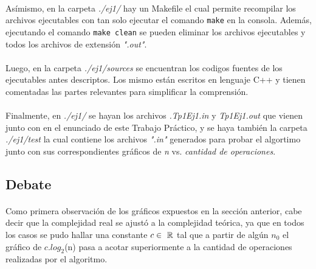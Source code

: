 \paragraph{}
Asímismo, en la carpeta \textit{./ej1/} hay un Makefile el cual permite recompilar los archivos ejecutables con tan solo ejecutar el comando \texttt{make} en la consola. Además, ejecutando el comando \texttt{make clean} se pueden eliminar los archivos ejecutables y todos los archivos de extensión \textit{".out"}.

\paragraph{}
Luego, en la carpeta \textit{./ej1/sources} se encuentran los codigos fuentes de los ejecutables antes descriptos. Los mismo están escritos en lenguaje C++ y tienen comentadas las partes relevantes para simplificar la comprensión.

\paragraph{}
Finalmente, en \textit{./ej1/} se hayan los archivos \textit{.Tp1Ej1.in} y \textit{Tp1Ej1.out} que vienen junto con en el enunciado de este Trabajo Práctico, y se haya también la carpeta \textit{./ej1/test} la cual contiene los archivos \textit{".in"} generados para probar el algortimo junto con sus correspondientes gráficos de \textit{n} vs. \textit{cantidad de operaciones}.


\subsection{Debate}
\label{Debate1}

\paragraph{}
Como primera observación de los gráficos expuestos en la sección anterior, cabe decir que la complejidad real se ajustó a la complejidad teórica, ya que en todos los casos se pudo hallar una constante $c \in\ \mathbb{R}$ tal que a partir de algún $n_0$ el gráfico de $c.log_2$(n) pasa a acotar superiormente a la cantidad de operaciones realizadas por el algoritmo.

